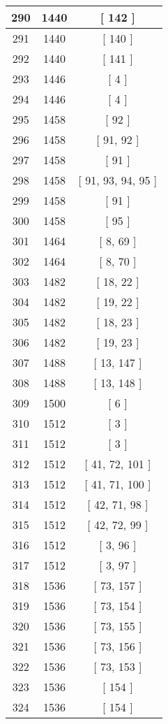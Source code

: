 \begin{center}
\begin{longtable}[H]{|| c c c ||}
\hline
290 & 1440 & [ 142 ] \\ 
\hline
291 & 1440 & [ 140 ] \\ 
\hline
292 & 1440 & [ 141 ] \\ 
\hline
293 & 1446 & [ 4 ] \\ 
\hline
294 & 1446 & [ 4 ] \\ 
\hline
295 & 1458 & [ 92 ] \\ 
\hline
296 & 1458 & [ 91, 92 ] \\ 
\hline
297 & 1458 & [ 91 ] \\ 
\hline
298 & 1458 & [ 91, 93, 94, 95 ] \\ 
\hline
299 & 1458 & [ 91 ] \\ 
\hline
300 & 1458 & [ 95 ] \\ 
\hline
301 & 1464 & [ 8, 69 ] \\ 
\hline
302 & 1464 & [ 8, 70 ] \\ 
\hline
303 & 1482 & [ 18, 22 ] \\ 
\hline
304 & 1482 & [ 19, 22 ] \\ 
\hline
305 & 1482 & [ 18, 23 ] \\ 
\hline
306 & 1482 & [ 19, 23 ] \\ 
\hline
307 & 1488 & [ 13, 147 ] \\ 
\hline
308 & 1488 & [ 13, 148 ] \\ 
\hline
309 & 1500 & [ 6 ] \\ 
\hline
310 & 1512 & [ 3 ] \\ 
\hline
311 & 1512 & [ 3 ] \\ 
\hline
312 & 1512 & [ 41, 72, 101 ] \\ 
\hline
313 & 1512 & [ 41, 71, 100 ] \\ 
\hline
314 & 1512 & [ 42, 71, 98 ] \\ 
\hline
315 & 1512 & [ 42, 72, 99 ] \\ 
\hline
316 & 1512 & [ 3, 96 ] \\ 
\hline
317 & 1512 & [ 3, 97 ] \\ 
\hline
318 & 1536 & [ 73, 157 ] \\ 
\hline
319 & 1536 & [ 73, 154 ] \\ 
\hline
320 & 1536 & [ 73, 155 ] \\ 
\hline
321 & 1536 & [ 73, 156 ] \\ 
\hline
322 & 1536 & [ 73, 153 ] \\ 
\hline
323 & 1536 & [ 154 ] \\ 
\hline
324 & 1536 & [ 154 ] \\ 
\hline

\end{longtable}
\end{center}
